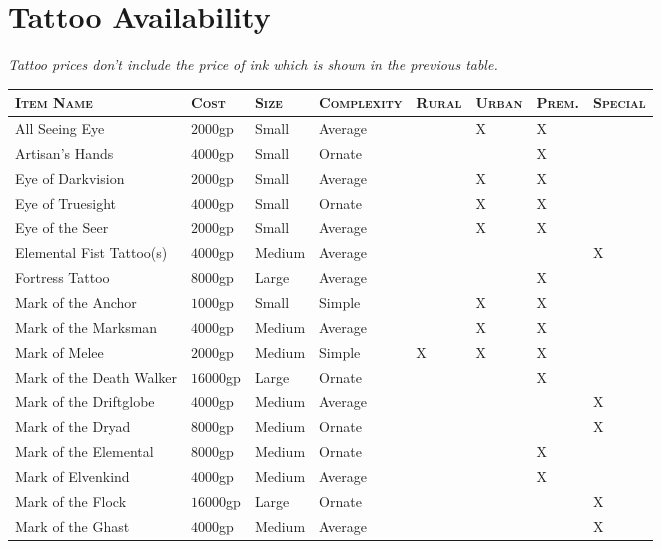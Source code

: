 \documentclass[a5paper,8pt]{book}
\begin{document}
\section{Tattoo Availability}
\emph{Tattoo prices don’t include the price of ink which is shown in the previous table.}
\begin{tabularx}{\textwidth}{|lZZZYYYY|}
    \hline
    \textsc{Item Name} & \textsc{Cost} & \textsc{Size} & \textsc{Complexity} & \textsc{Rural} & \textsc{Urban} & \textsc{Prem.} & \textsc{Special}\\\hline
    All Seeing Eye & $2000$gp & Small & Average & ~ & X & X & ~ \\\hline 
    Artisan’s Hands & $4000$gp & Small & Ornate & ~ & ~ & X & ~ \\\hline 
    Eye of Darkvision & $2000$gp & Small & Average & ~ & X & X & ~ \\\hline 
    Eye of Truesight & $4000$gp & Small & Ornate  & ~ & X & X & ~ \\\hline 
    Eye of the Seer & $2000$gp  & Small   & Average & ~ & X & X & ~ \\\hline 
    Elemental Fist Tattoo(s)& $4000$gp  & Medium  & Average & ~ & ~ & ~ & X \\\hline 
    Fortress Tattoo & $8000$gp  & Large   & Average & ~ & ~ & X & ~ \\\hline 
    Mark of the Anchor & $1000$gp  & Small   & Simple  & ~ & X & X & ~ \\\hline 
    Mark of the Marksman & $4000$gp  & Medium  & Average & ~ & X & X & ~ \\\hline 
    Mark of Melee & $2000$gp  & Medium  & Simple  & X & X & X & ~ \\\hline 
    Mark of the Death Walker & $16000$gp & Large   & Ornate  & ~ & ~ & X & ~ \\\hline 
    Mark of the Driftglobe & $4000$gp  & Medium  & Average & ~ & ~ & ~ & X \\\hline 
    Mark of the Dryad & $8000$gp  & Medium  & Ornate  & ~ & ~ & ~ & X \\\hline 
    Mark of the Elemental & $8000$gp  & Medium  & Ornate  & ~ & ~ & X & ~ \\\hline 
    Mark of Elvenkind & $4000$gp  & Medium  & Average & ~ & ~ & X & ~ \\\hline 
    Mark of the Flock & $16000$gp & Large   & Ornate  & ~ & ~ & ~ & X \\\hline 
    Mark of the Ghast & $4000$gp  & Medium  & Average & ~ & ~ & ~ & X \\\hline 

\end{tabularx}
\end{document}
